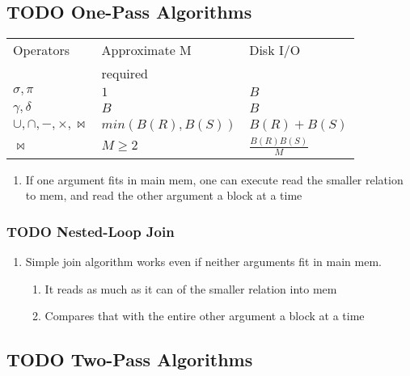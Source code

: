 \documentclass[11pt]{article}
\begin{document}
\subsection{\textbf{TODO} One-Pass Algorithms}
\label{sec-12.4}


\begin{center}
\begin{tabular}{lll}
 Operators                     &  Approximate M     &  Disk I/O              \\
                               &  required          &                        \\
\hline
 $\sigma, \pi$                 &  $1$               &  $B$                   \\
 $\gamma, \delta$              &  $B$               &  $B$                   \\
 $\cup,\cap,-,\times,\bowtie$  &  $min(B(R),B(S))$  &  $B(R)+B(S)$           \\
 $\bowtie$                     &  $M \geq 2$        &  $\frac{B(R)B(S)}{M}$  \\
\end{tabular}
\end{center}



\begin{enumerate}
\item If one argument fits in main mem, one can execute read the
      smaller relation to mem, and read the other argument a block at
      a time
\end{enumerate}
\subsubsection{\textbf{TODO} Nested-Loop Join}
\label{sec-12.4.1}

\begin{enumerate}
\item Simple join algorithm works even if neither arguments fit in
       main mem.

\begin{enumerate}
\item It reads as much as it can of the smaller relation into mem
\item Compares that with the entire other argument a block at a
          time
\end{enumerate}

\end{enumerate}
\subsection{\textbf{TODO} Two-Pass Algorithms}
\label{sec-12.5}
\end{document}
